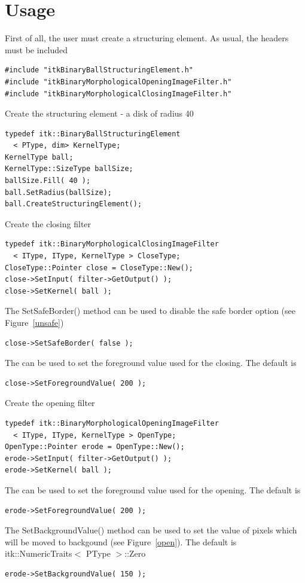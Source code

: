 \documentclass{InsightArticle}
\begin{document}
\section{Usage}

First of all, the user must create a structuring element. As usual, the headers must be included

\small \begin{verbatim}
#include "itkBinaryBallStructuringElement.h"
#include "itkBinaryMorphologicalOpeningImageFilter.h"
#include "itkBinaryMorphologicalClosingImageFilter.h"
\end{verbatim} \normalsize
Create the structuring element - a disk of radius 40
\small \begin{verbatim}
typedef itk::BinaryBallStructuringElement
  < PType, dim> KernelType;
KernelType ball;
KernelType::SizeType ballSize;
ballSize.Fill( 40 );
ball.SetRadius(ballSize);
ball.CreateStructuringElement();
\end{verbatim} \normalsize
Create the closing filter
\small \begin{verbatim}
typedef itk::BinaryMorphologicalClosingImageFilter
  < IType, IType, KernelType > CloseType;
CloseType::Pointer close = CloseType::New();
close->SetInput( filter->GetOutput() );
close->SetKernel( ball );
\end{verbatim} \normalsize
The SetSafeBorder() method can be used to disable the safe border option (see Figure~\ref{unsafe})
\small \begin{verbatim}
close->SetSafeBorder( false );
\end{verbatim} \normalsize
The  can be used to set the foreground value used for the closing. The default is 
\small \begin{verbatim}
close->SetForegroundValue( 200 );
\end{verbatim} \normalsize
Create the opening filter
\small \begin{verbatim}
typedef itk::BinaryMorphologicalOpeningImageFilter
  < IType, IType, KernelType > OpenType;
OpenType::Pointer erode = OpenType::New();
erode->SetInput( filter->GetOutput() );
erode->SetKernel( ball );
\end{verbatim} \normalsize
The  can be used to set the foreground value used for the opening. The default is 
\small \begin{verbatim}
erode->SetForegroundValue( 200 );
\end{verbatim} \normalsize
The SetBackgroundValue() method can be used to set the value of pixels which will be moved to backgound (see Figure~\ref{open}). The default is itk::NumericTraits$<$ PType $>$::Zero
\small \begin{verbatim}
erode->SetBackgroundValue( 150 );
\end{verbatim} \normalsize
\end{document}
